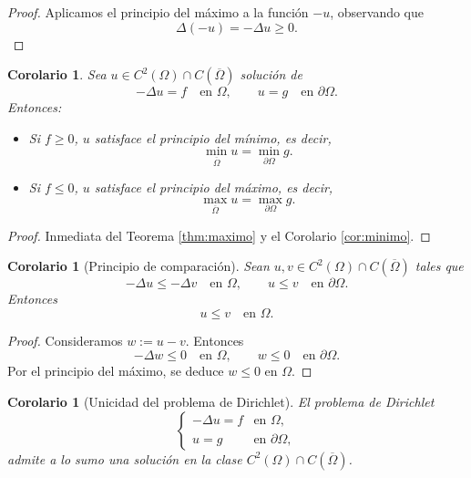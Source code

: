\documentclass[12pt, a4paper]{amsbook}
\newtheorem{cor}[teo]{Corolario}
\theoremstyle{remark}
\theoremstyle{definition}
\numberwithin{section}{chapter}
\numberwithin{subsection}{section}
\numberwithin{equation}{section}
\numberwithin{figure}{chapter}
\begin{document}
\begin{proof}
Aplicamos el principio del máximo a la función $-u$, observando que
\[
\Delta(-u) = -\Delta u \ge 0.
\]
\end{proof}

\medskip

\begin{cor}
Sea $u \in C^2(\Omega) \cap C(\overline{\Omega})$ solución de
\[
-\Delta u = f \quad \text{en } \Omega,\qquad u=g\quad \text{en }\partial\Omega.
\]
Entonces:
\begin{itemize} 
\item Si $f\ge 0$, $u$ satisface el principio del mínimo, es decir,
\[
\min_{\overline{\Omega}} u = \min_{\partial \Omega} g.
\]
\item Si $f\le 0$, $u$ satisface el principio del máximo, es decir,
\[
\max_{\overline{\Omega}} u = \max_{\partial \Omega} g.
\]
\end{itemize}
\end{cor}

\begin{proof}
Inmediata del Teorema \ref{thm:maximo} y el Corolario \ref{cor:minimo}.
\end{proof}

\medskip

\begin{cor}[Principio de comparación]
Sean $u,v \in C^2(\Omega) \cap C(\overline{\Omega})$ tales que
\[
-\Delta u \le -\Delta v \quad \text{en } \Omega,
\qquad
u \le v \quad \text{en } \partial \Omega.
\]
Entonces
\[
u \le v \quad \text{en } \Omega.
\]
\end{cor}

\begin{proof}
Consideramos $w := u - v$. Entonces
\[
-\Delta w \le 0 \quad \text{en } \Omega,
\qquad
w \le 0 \quad \text{en } \partial \Omega.
\]
Por el principio del máximo, se deduce $w \le 0$ en $\Omega$.
\end{proof}

\medskip

\begin{cor}[Unicidad del problema de Dirichlet]
El problema de Dirichlet
\[
\begin{cases}
-\Delta u = f & \text{en } \Omega,\\
u = g & \text{en } \partial \Omega,
\end{cases}
\]
admite a lo sumo una solución en la clase $C^2(\Omega) \cap C(\overline{\Omega})$.
\end{cor}
\end{document}
